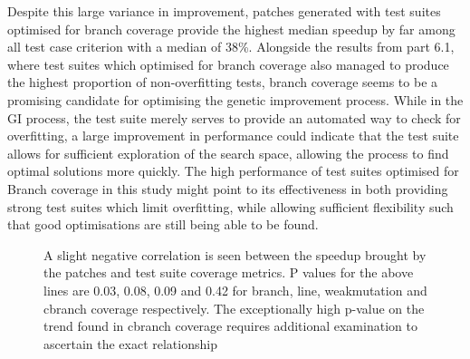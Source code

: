 \documentclass[titlepage]{article}
\begin{document}
Despite this large variance in improvement, patches generated with test suites optimised for branch coverage provide the highest median speedup by far among all test case criterion with a median of 38\%.  Alongside the results from part 6.1, where test suites which optimised for branch coverage also managed to produce the highest proportion of non-overfitting tests, branch coverage seems to be a promising candidate for optimising the genetic improvement process. While in the GI process, the test suite merely serves to provide an automated way to check for overfitting, a large improvement in performance could indicate that the test suite allows for sufficient exploration of the search space, allowing the process to find optimal solutions more quickly. The high performance of test suites optimised for Branch coverage in this study might point to its effectiveness in both providing strong test suites which limit overfitting, while allowing sufficient flexibility such that good optimisations are still being able to be found.

\begin{figure}
    \caption{A slight negative correlation is seen between the speedup brought by the patches and test suite coverage metrics. P values for the above lines are 0.03, 0.08, 0.09 and 0.42 for branch, line, weakmutation and cbranch coverage respectively. The exceptionally high p-value on the trend found in cbranch coverage requires additional examination to ascertain the exact relationship}
    \centering
\end{figure}
\end{document}
